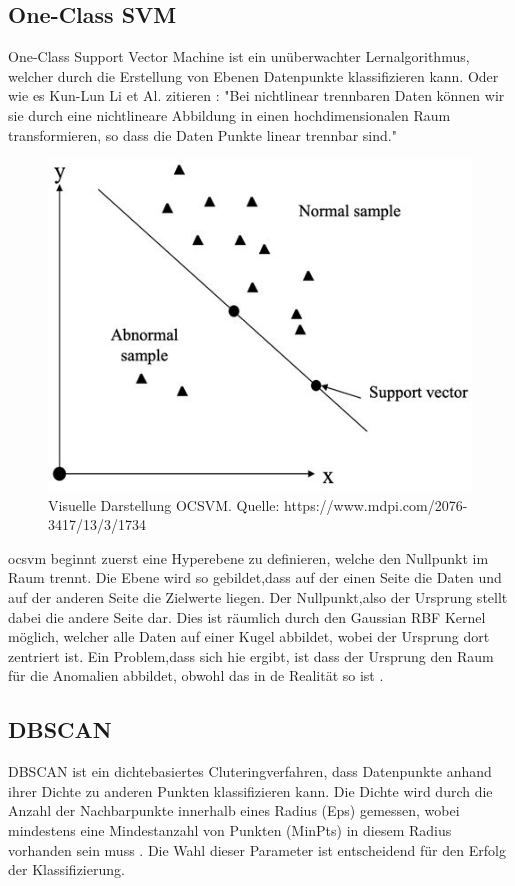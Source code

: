 \documentclass[a4paper,12pt]{article}
\begin{document}
	\subsection{One-Class SVM}
	One-Class Support Vector Machine ist ein unüberwachter Lernalgorithmus, welcher durch die Erstellung von Ebenen Datenpunkte klassifizieren kann. Oder wie es Kun-Lun Li et Al. zitieren \cite{li2003improving}:
	"Bei nichtlinear trennbaren Daten können wir sie durch eine nichtlineare Abbildung in einen hochdimensionalen Raum transformieren, so dass die Daten Punkte linear trennbar sind."
	\\[0.5em]
	\begin{figure}
		\centering
		\includegraphics[width=0.7\linewidth]{screenshot006}
		\caption{Visuelle Darstellung  OCSVM. Quelle: https://www.mdpi.com/2076-3417/13/3/1734}
		\label{fig:screenshot006}
	\end{figure}
	
	\gls{ocsvm} beginnt zuerst eine Hyperebene zu definieren, welche den Nullpunkt im Raum trennt. Die Ebene wird so gebildet,dass auf der einen Seite die Daten und auf der anderen Seite die Zielwerte liegen. Der Nullpunkt,also der Ursprung stellt dabei die andere Seite dar. Dies ist räumlich durch den Gaussian RBF Kernel möglich, welcher alle Daten auf einer Kugel abbildet, wobei der Ursprung dort zentriert ist. Ein Problem,dass sich hie ergibt, ist dass der Ursprung den Raum für die Anomalien abbildet, obwohl das in de Realität so ist \cite{bounsiar2025oneclass}.
	
	\subsection{DBSCAN}
	DBSCAN ist ein dichtebasiertes Cluteringverfahren, dass Datenpunkte anhand ihrer Dichte zu anderen Punkten klassifizieren kann.
	Die Dichte wird durch die Anzahl der Nachbarpunkte innerhalb eines Radius (Eps) gemessen, wobei mindestens eine Mindestanzahl von Punkten (MinPts) in diesem Radius vorhanden sein muss \cite{ester1996dbscan}. Die Wahl dieser Parameter ist entscheidend für den Erfolg der Klassifizierung.
	
\end{document}
